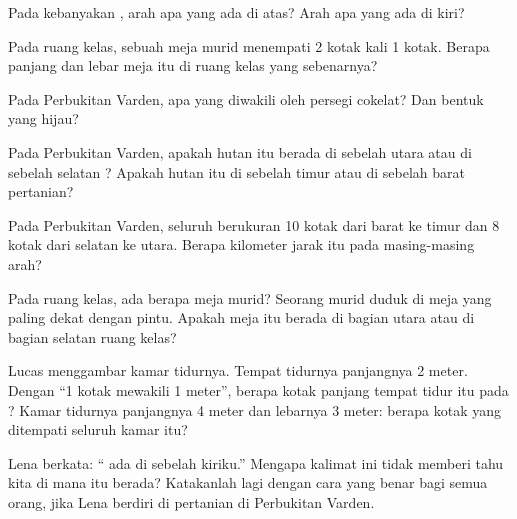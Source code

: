 \begin{exercise}[$\star$]\label{exo:g2:drawing-to-map:4}
Pada kebanyakan , arah apa yang ada di atas? Arah apa yang ada di kiri?
\end{exercise}

\begin{exercise}[$\star$]\label{exo:g2:drawing-to-map:5}
Pada  ruang kelas, sebuah meja murid menempati 2 kotak kali 1 kotak.
Berapa panjang dan lebar meja itu di ruang kelas yang sebenarnya?
\end{exercise}

\begin{exercise}[$\star$]\label{exo:g2:drawing-to-map:6}
Pada  Perbukitan Varden, apa yang diwakili oleh persegi cokelat? Dan
bentuk yang hijau?
\end{exercise}

\begin{exercise}[$\star\star$]\label{exo:g2:drawing-to-map:7}
Pada  Perbukitan Varden, apakah hutan itu berada di sebelah utara atau
di sebelah selatan ? Apakah hutan itu di sebelah timur atau di
sebelah barat pertanian?
\end{exercise}

\begin{exercise}[$\star\star$]\label{exo:g2:drawing-to-map:8}
Pada  Perbukitan Varden, seluruh  berukuran 10 kotak dari barat ke
timur dan 8 kotak dari selatan ke utara. Berapa kilometer jarak itu pada
masing-masing arah?
\end{exercise}

\begin{exercise}[$\star\star$]\label{exo:g2:drawing-to-map:9}
Pada  ruang kelas, ada berapa meja murid? Seorang murid duduk di meja
yang paling dekat dengan pintu. Apakah meja itu berada di bagian utara atau
di bagian selatan ruang kelas?
\end{exercise}

\begin{exercise}[$\star\star$]\label{exo:g2:drawing-to-map:10}
Lucas menggambar  kamar tidurnya. Tempat tidurnya panjangnya 2 meter.
Dengan  ``1 kotak mewakili 1 meter'', berapa kotak panjang tempat
tidur itu pada ? Kamar tidurnya panjangnya 4 meter dan lebarnya 3
meter: berapa kotak yang ditempati seluruh kamar itu?
\end{exercise}

\begin{exercise}[$\star\star$]\label{exo:g2:drawing-to-map:11}
Lena berkata: `` ada di sebelah kiriku.'' Mengapa kalimat ini
tidak memberi tahu kita di mana  itu berada? Katakanlah lagi dengan
cara yang benar bagi semua orang, jika Lena berdiri di pertanian di
Perbukitan Varden.
\end{exercise}
